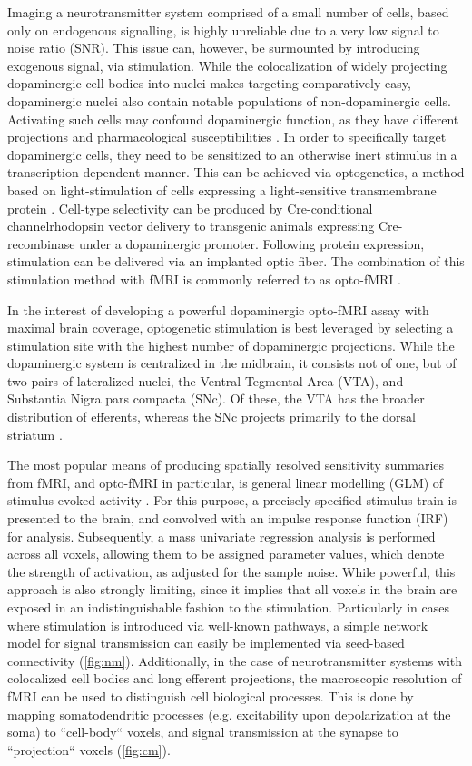Imaging a neurotransmitter system comprised of a small number of cells, based only on endogenous signalling, is highly unreliable due to a very low signal to noise ratio (SNR).
This issue can, however, be surmounted by introducing exogenous signal, via stimulation.
While the colocalization of widely projecting dopaminergic cell bodies into nuclei makes targeting comparatively easy, dopaminergic nuclei also contain notable populations of non-dopaminergic cells.
Activating such cells may confound dopaminergic function, as they have different projections and pharmacological susceptibilities \cite{Taylor2014}.
In order to specifically target dopaminergic cells, they need to be sensitized to an otherwise inert stimulus in a transcription-dependent manner.
This can be achieved via optogenetics, a method based on light-stimulation of cells expressing a light-sensitive transmembrane protein \cite{Boyden2005}.
Cell-type selectivity can be produced by Cre-conditional channelrhodopsin vector delivery \cite{Orban1992} to transgenic animals expressing Cre-recombinase under a dopaminergic promoter.
Following protein expression, stimulation can be delivered via an implanted optic fiber.
The combination of this stimulation method with fMRI is commonly referred to as opto-fMRI \cite{Desai2011,Grandjean2019}.

In the interest of developing a powerful dopaminergic opto-fMRI assay with maximal brain coverage, optogenetic stimulation is best leveraged by selecting a stimulation site with the highest number of dopaminergic projections.
While the dopaminergic system is centralized in the midbrain, it consists not of one, but of two pairs of lateralized nuclei, the Ventral Tegmental Area (VTA), and Substantia Nigra pars compacta (SNc).
Of these, the VTA has the broader distribution of efferents, whereas the SNc projects primarily to the dorsal striatum \cite{Pan2010}.

The most popular means of producing spatially resolved sensitivity summaries from fMRI, and opto-fMRI in particular, is general linear modelling (GLM) of stimulus evoked activity \cite{Friston1995}.
For this purpose, a precisely specified stimulus train is presented to the brain, and convolved with an impulse response function (IRF) for analysis.
Subsequently, a mass univariate regression analysis is performed across all voxels, allowing them to be assigned parameter values, which denote the strength of activation, as adjusted for the sample noise.
While powerful, this approach is also strongly limiting, since it implies that all voxels in the brain are exposed in an indistinguishable fashion to the stimulation.
Particularly in cases where stimulation is introduced via well-known pathways, a simple network model for signal transmission can easily be implemented via seed-based connectivity (\cref{fig:nm}).
Additionally, in the case of neurotransmitter systems with colocalized cell bodies and long efferent projections, the macroscopic resolution of fMRI can be used to distinguish cell biological processes.
This is done by mapping somatodendritic processes (e.g. excitability upon depolarization at the soma) to “cell-body“ voxels, and signal transmission at the synapse to “projection“ voxels (\cref{fig:cm}).

